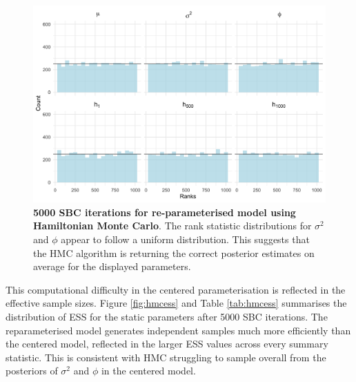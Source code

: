 \documentclass[12pt, a4paper]{article}
\begin{document}
    \begin{figure}[H]
        \centering
        \includegraphics[scale=0.09]{results/hmc_ncp_5k.png}
        \caption{\textbf{5000 SBC iterations for re-parameterised model using Hamiltonian Monte Carlo}. The rank statistic distributions for $\sigma^2$ and $\phi$ appear to follow a uniform distribution. This suggests that the HMC algorithm is returning the correct posterior estimates on average for the displayed parameters.}
        \label{fig:ncphmc5k}
    \end{figure}

    This computational difficulty in the centered parameterisation is reflected in the effective sample sizes. Figure \ref{fig:hmcess} and Table \ref{tab:hmcess} summarises the distribution of ESS for the static parameters after 5000 SBC iterations. The reparameterised model generates independent samples much more efficiently than the centered model, reflected in the larger ESS values across every summary statistic.  This is consistent with HMC struggling to sample overall from the posteriors of $\sigma^2$ and $\phi$ in the centered model. 
\end{document}
